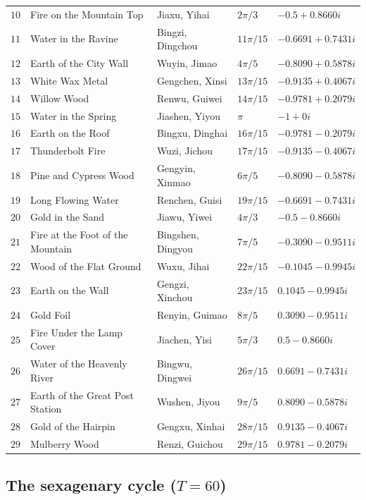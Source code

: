 \begin{longtable}{>{\centering\arraybackslash}p{0.8cm}>{\raggedright\arraybackslash}p{2.7cm}>{\raggedright\arraybackslash}p{2.5cm}>{\centering\arraybackslash}p{1.8cm}>{\raggedright\arraybackslash}p{3.2cm}}
$10$ & Fire on the Mountain Top   & Jiaxu, Yihai & $2\pi/3$ & $-0.5+0.8660i$ \\
$11$ & Water in the Ravine   & Bingzi, Dingchou & $11\pi/15$ & $-0.6691+0.7431i$ \\
$12$ & Earth of the City Wall   & Wuyin, Jimao & $4\pi/5$ & $-0.8090+0.5878i$ \\
$13$ & White Wax Metal   & Gengchen, Xinsi & $13\pi/15$ & $-0.9135+0.4067i$ \\
$14$ & Willow Wood   & Renwu, Guiwei & $14\pi/15$ & $-0.9781+0.2079i$ \\
$15$ & Water in the Spring   & Jiashen, Yiyou & $\pi$ & $-1+0i$ \\
$16$ & Earth on the Roof   & Bingxu, Dinghai & $16\pi/15$ & $-0.9781-0.2079i$ \\
$17$ & Thunderbolt Fire   & Wuzi, Jichou & $17\pi/15$ & $-0.9135-0.4067i$ \\
$18$ & Pine and Cypress Wood   & Gengyin, Xinmao & $6\pi/5$ & $-0.8090-0.5878i$ \\
$19$ & Long Flowing Water   & Renchen, Guisi & $19\pi/15$ & $-0.6691-0.7431i$ \\
$20$ & Gold in the Sand   & Jiawu, Yiwei & $4\pi/3$ & $-0.5-0.8660i$ \\
$21$ & Fire at the Foot of the Mountain   & Bingshen, Dingyou & $7\pi/5$ & $-0.3090-0.9511i$ \\
$22$ & Wood of the Flat Ground   & Wuxu, Jihai & $22\pi/15$ & $-0.1045-0.9945i$ \\
$23$ & Earth on the Wall   & Gengzi, Xinchou & $23\pi/15$ & $0.1045-0.9945i$ \\
$24$ & Gold Foil   & Renyin, Guimao & $8\pi/5$ & $0.3090-0.9511i$ \\
$25$ & Fire Under the Lamp Cover   & Jiachen, Yisi & $5\pi/3$ & $0.5-0.8660i$ \\
$26$ & Water of the Heavenly River   & Bingwu, Dingwei & $26\pi/15$ & $0.6691-0.7431i$ \\
$27$ & Earth of the Great Post Station   & Wushen, Jiyou & $9\pi/5$ & $0.8090-0.5878i$ \\
$28$ & Gold of the Hairpin   & Gengxu, Xinhai & $28\pi/15$ & $0.9135-0.4067i$ \\
$29$ & Mulberry Wood   & Renzi, Guichou & $29\pi/15$ & $0.9781-0.2079i$ \\
\end{longtable}

\subsection{\texorpdfstring{The sexagenary cycle ($T=60$)}{The sexagenary cycle (T=60)}}

